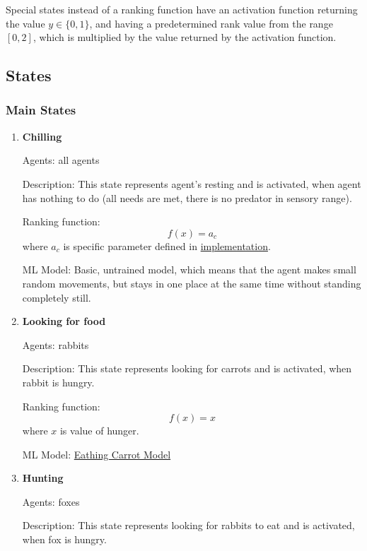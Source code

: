 Special states instead of a ranking function have an activation function returning the value $y \in \{0, 1\}$, and having a predetermined rank value from the range $[0, 2]$, which is multiplied by the value returned by the activation function.

\subsection{States}
\label{statesDefinition}
\subsubsection{Main States}
\begin{enumerate}
    \item \textbf{Chilling}
    
    Agents: all agents
    
    Description: This state represents agent's resting and is activated, when agent has nothing to do (all needs are met, there is no predator in sensory range).
    
    Ranking function:
    \begin{equation}
        f(x) = a_c
    \end{equation}
    where $a_c$ is specific parameter defined in \hyperref[featuresNeedsStatesImplementation]{implementation}.
    
    ML Model: Basic, untrained model, which means that the agent makes small random movements, but stays in one place at the same time without standing completely still.
    
    \item \textbf{Looking for food}
    
    Agents: rabbits
    
    Description: This state represents looking for carrots and is activated, when rabbit is hungry.
    
    Ranking function:
    \begin{equation}
        f(x) = x
    \end{equation}
    where $x$ is value of hunger.
    
    ML Model: \hyperref[eatingCarrotModel]{Eathing Carrot Model}
    
    \item \textbf{Hunting}
    
    Agents: foxes
    
    Description: This state represents looking for rabbits to eat and is activated, when fox is hungry.
    

\end{enumerate}

